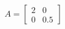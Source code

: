 \documentclass[preview]{standalone}
\begin{document}
\begin{align*}
A = \begin{bmatrix} 2 & 0 \\ 0 & 0.5 \end{bmatrix}
\end{align*}
\end{document}
